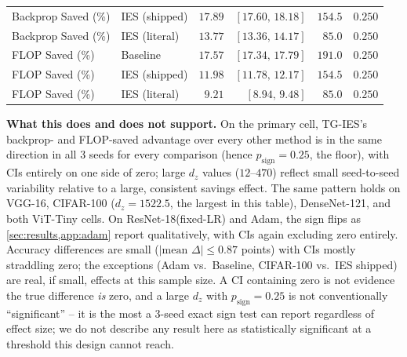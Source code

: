 \documentclass{article}
\newcommand{\win}[1]{\cellcolor{tgwin}#1}
\theoremstyle{plain}
\theoremstyle{definition}
\theoremstyle{remark}
\begin{document}
\begin{longtable}{llrrrr}
Backprop Saved (\%) & IES (shipped) & \win{$17.89$} & $[17.60,\,18.18]$ & $154.5$ & $0.250$ \\
Backprop Saved (\%) & IES (literal) & \win{$13.77$} & $[13.36,\,14.17]$ & $85.0$ & $0.250$ \\
FLOP Saved (\%) & Baseline & \win{$17.57$} & $[17.34,\,17.79]$ & $191.0$ & $0.250$ \\
FLOP Saved (\%) & IES (shipped) & \win{$11.98$} & $[11.78,\,12.17]$ & $154.5$ & $0.250$ \\
FLOP Saved (\%) & IES (literal) & \win{$9.21$} & $[8.94,\,9.48]$ & $85.0$ & $0.250$ \\
\end{longtable}
\endgroup

\textbf{What this does and does not support.} On the primary cell, TG-IES's backprop- and FLOP-saved advantage over every other method is in the same direction in all 3 seeds for every comparison (hence $p_{\mathrm{sign}}=0.25$, the floor), with CIs entirely on one side of zero; large $d_z$ values ($12$--$470$) reflect small seed-to-seed variability relative to a large, consistent savings effect. The same pattern holds on VGG-16, CIFAR-100 ($d_z=1522.5$, the largest in this table), DenseNet-121, and both ViT-Tiny cells. On ResNet-18(fixed-LR) and Adam, the sign flips as \cref{sec:results,app:adam} report qualitatively, with CIs again excluding zero entirely. Accuracy differences are small ($|\text{mean }\Delta|\le0.87$ points) with CIs mostly straddling zero; the exceptions (Adam vs.\ Baseline, CIFAR-100 vs.\ IES shipped) are real, if small, effects at this sample size. A CI containing zero is not evidence the true difference \emph{is} zero, and a large $d_z$ with $p_{\mathrm{sign}}=0.25$ is not conventionally ``significant'' -- it is the most a 3-seed exact sign test can report regardless of effect size; we do not describe any result here as statistically significant at a threshold this design cannot reach.
\end{document}
